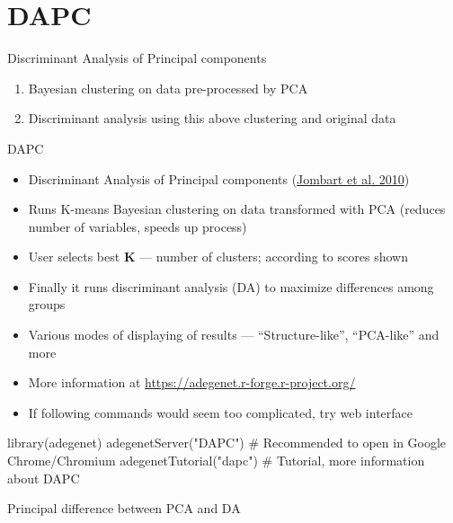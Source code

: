 \documentclass[compress, ucs, xelatex, 11pt, xcolor=svgnames, aspectratio=169,
	hyperref={
		bookmarks=true,
		unicode=true,
		colorlinks=true,
		pdftitle={Molecular data in R},
		plainpages=false,
		pdfauthor={Vojtech Zeisek},
		pdfsubject={Course about phylogeny and evolution in R},
		pdfcreator={XeLaTeX},
		pdfkeywords={R, evolution, phylogeny, molecular data},
		linkcolor=Crimson, %
		anchorcolor=Magenta, %
		citecolor=Magenta, %
		filecolor=Magenta, %
		menucolor=Magenta, %
		urlcolor=DodgerBlue, %
		pdftex},
	url={hyphens, lowtilde} %
	]{beamer}
\renewcommand{\texttt}[1]{\colorbox{Beige}{{\ttfamily #1}}}
\begin{document}
\section{DAPC}

\begin{frame}{Discriminant Analysis of Principal components}
	\tableofcontents[currentsection, sectionstyle=show/hide, hideothersubsections]
	\begin{enumerate}
	 \item Bayesian clustering on data pre-processed by PCA
	 \item Discriminant analysis using this above clustering and original data
	\end{enumerate}
\end{frame}

\begin{frame}[fragile]{DAPC}
	\label{DAPC}
	\begin{itemize}
		\item Discriminant Analysis of Principal components (\href{https://bmcgenet.biomedcentral.com/articles/10.1186/1471-2156-11-94}{Jombart et al. 2010})
		\item Runs K-means Bayesian clustering on data transformed with PCA (reduces number of variables, speeds up process)
		\item User selects best \textbf{K} --- number of clusters; according to scores shown
		\item Finally it runs discriminant analysis (DA) to maximize differences among groups
		\item Various modes of displaying of results --- \enquote{Structure-like}, \enquote{PCA-like} and more
		\item More information at \url{https://adegenet.r-forge.r-project.org/}
		\item If following commands would seem too complicated, try web interface
	\end{itemize}
	\begin{spluscode}
    library(adegenet)
    adegenetServer("DAPC") # Recommended to open in Google Chrome/Chromium
    adegenetTutorial("dapc") # Tutorial, more information about DAPC
	\end{spluscode}
\end{frame}

\begin{frame}{Principal difference between PCA and DA}
	\begin{center}
		\texttt{[image: dapc-da-pca.png]}
	\end{center}
\end{frame}
\end{document}
